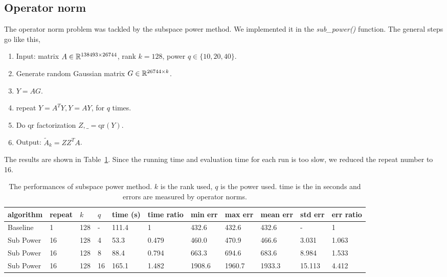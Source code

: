\subsection{Operator norm}
The operator norm problem was tackled by the subspace power method.
We implemented it in the \textit{sub\_power()} function.
The general steps go like this,
\begin{enumerate}
    \item Input: matrix $A\in {\mathbb{R}}^{138493\times 26744}$,
    rank $k=128$, power $q\in\{10,20,40\}$.
    \item Generate random Gaussian matrix $G\in{\mathbb{R}}^{26744\times k}$.
    \item $Y=AG$.
    \item repeat $Y = A^T Y, Y=AY$, for $q$ times.\
    \item Do qr factorization $Z, \_ = \text{qr}(Y)$.
    \item Output: $\tilde{A}_k = Z Z^T A$.
\end{enumerate}

The results are shown in Table~\ref{tab:op}.
Since the running time and evaluation time for each run is too slow,
we reduced the repeat number to 16.

\begin{table}[htb]
  \setlength{\tabcolsep}{2.6pt}
  \caption{The performances of subspace power method.
  $k$ is the rank used, $q$ is the power used.
  time is the in seconds and
  errors are measured by operator norms.
    }
  \label{tab:op}
  \centering
  {\small
  \begin{tabular}{lllllllllll}
    \toprule
    algorithm & repeat & $k$ & $q$ & time (s) & time ratio & min err & max err & mean err & std err & err ratio \\
    \midrule
    Baseline & 1 & 128 & - & 111.4 & 1 & 432.6 & 432.6 & 432.6 & - & 1 \\
    Sub Power & 16 & 128 & 4 & 53.3 & 0.479 & 460.0 & 470.9 & 466.6 & 3.031 & 1.063 \\
    Sub Power & 16 & 128 & 8 & 88.4 & 0.794 & 663.3 & 694.6 & 683.6 & 8.984 & 1.533 \\
    Sub Power & 16 & 128 & 16 & 165.1 & 1.482 & 1908.6 & 1960.7 & 1933.3 & 15.113 & 4.412 \\
    \bottomrule
  \end{tabular}
  }
\end{table}

